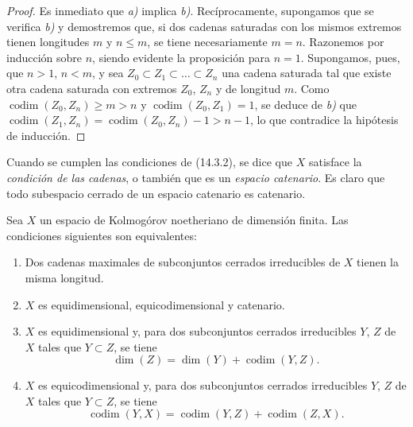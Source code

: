 \begin{proof}
Es inmediato que \emph{a)} implica \emph{b)}. Recíprocamente, supongamos que se verifica \emph{b)} y
demostremos que, si dos cadenas saturadas con los mismos extremos tienen
longitudes $m$ y $n\leq m$, se tiene necesariamente $m=n$. Razonemos por
inducción sobre $n$, siendo evidente la proposición para $n=1$. Supongamos,
pues, que $n>1$, $n<m$, y sea $Z_0\subset Z_1\subset\ldots\subset Z_n$ una
cadena saturada tal que existe otra cadena saturada con extremos
$Z_0$, $Z_n$ y de longitud $m$. Como
$\operatorname{codim}(Z_0,Z_n)\geq m>n$ y
$\operatorname{codim}(Z_0,Z_1)=1$, se deduce de \emph{b)} que
$\operatorname{codim}(Z_1,Z_n)=\operatorname{codim}(Z_0,Z_n)-1>n-1$, lo que
contradice la hipótesis de inducción.
\end{proof}

Cuando se cumplen las condiciones de (14.3.2), se dice que $X$ satisface la
\emph{condición de las cadenas}, o también que es un \emph{espacio catenario}.
Es claro que todo subespacio cerrado de un espacio catenario es catenario.

\begin{proposition}[14.3.3]
\label{0.14.3.3-fr}
Sea $X$ un espacio de Kolmogórov noetheriano de dimensión finita. Las
condiciones siguientes son equivalentes:
\begin{enumerate}
  \item[\rm a)] Dos cadenas maximales de subconjuntos cerrados irreducibles de
  $X$ tienen la misma longitud.
  \item[\rm b)] $X$ es equidimensional, equicodimensional y catenario.
  \item[\textup{c)}] $X$ es equidimensional y, para dos subconjuntos cerrados
  irreducibles $Y$, $Z$ de $X$ tales que $Y\subset Z$, se tiene
  \[
    \dim(Z)=\dim(Y)+\operatorname{codim}(Y,Z).
    \tag{14.3.3.1}\label{0.14.3.3.1-fr}
  \]
  \item[\textup{d)}] $X$ es equicodimensional y, para dos subconjuntos cerrados
  irreducibles $Y$, $Z$ de $X$ tales que $Y\subset Z$, se tiene
  \[
    \operatorname{codim}(Y,X)=
    \operatorname{codim}(Y,Z)+\operatorname{codim}(Z,X).
    \tag{14.3.3.2}\label{0.14.3.3.2-fr}
  \]
\end{enumerate}
\end{proposition}

